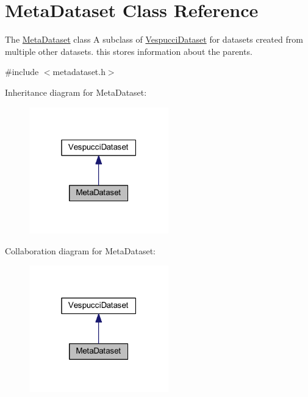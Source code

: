 \hypertarget{class_meta_dataset}{\section{Meta\+Dataset Class Reference}
\label{class_meta_dataset}
}


The \hyperlink{class_meta_dataset}{Meta\+Dataset} class A subclass of \hyperlink{class_vespucci_dataset}{Vespucci\+Dataset} for datasets created from multiple other datasets. this stores information about the parents.  




{\ttfamily \#include $<$metadataset.\+h$>$}



Inheritance diagram for Meta\+Dataset\+:\nopagebreak
\begin{figure}[H]
\begin{center}
\leavevmode
\includegraphics[width=171pt]{class_meta_dataset__inherit__graph}
\end{center}
\end{figure}


Collaboration diagram for Meta\+Dataset\+:\nopagebreak
\begin{figure}[H]
\begin{center}
\leavevmode
\includegraphics[width=171pt]{class_meta_dataset__coll__graph}
\end{center}
\end{figure}

